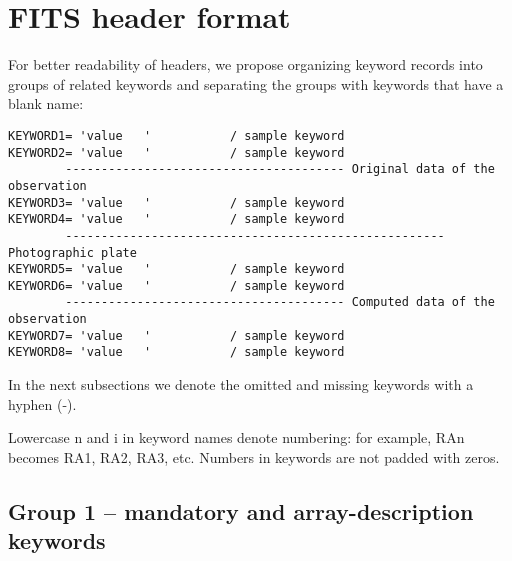\documentclass[11pt]{ivoa}
\begin{document}
\section{FITS header format}
\label{sect:format}

For better readability of headers, we propose organizing keyword records
into groups of related keywords and separating the groups with keywords
that have a blank name:

\begin{lstlisting}
KEYWORD1= 'value   '           / sample keyword
KEYWORD2= 'value   '           / sample keyword
        --------------------------------------- Original data of the observation
KEYWORD3= 'value   '           / sample keyword
KEYWORD4= 'value   '           / sample keyword
        ----------------------------------------------------- Photographic plate
KEYWORD5= 'value   '           / sample keyword
KEYWORD6= 'value   '           / sample keyword
        --------------------------------------- Computed data of the observation
KEYWORD7= 'value   '           / sample keyword
KEYWORD8= 'value   '           / sample keyword
\end{lstlisting}

In the next subsections we denote the omitted and missing keywords with
a hyphen (-).

Lowercase n and i in keyword names denote numbering: for example, RAn
becomes RA1, RA2, RA3, etc. Numbers in keywords are not padded with
zeros.

\subsection{Group 1 -- mandatory and array-description keywords}
\end{document}
